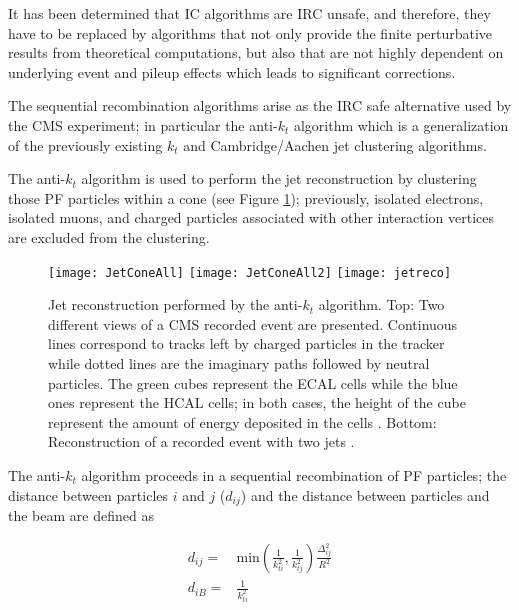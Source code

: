 It has been determined that IC algorithms are IRC unsafe, and therefore, they have to be replaced by algorithms that not only provide the finite perturbative results from theoretical computations, but also that are not highly dependent on underlying event and pileup effects which leads to significant corrections\cite{coco}.

The sequential recombination algorithms arise as the IRC safe alternative used by the CMS experiment; in particular the anti-$k_t$ algorithm\cite{antikt} which is a generalization of the previously existing $k_t$ \cite{kt} and Cambridge/Aachen \cite{ac} jet clustering algorithms.

The anti-$k_t$ algorithm is used to perform the jet reconstruction by clustering those PF particles within a cone (see Figure \ref{fig:jetcone}); previously, isolated electrons, isolated muons, and charged particles associated with other interaction vertices are excluded from the clustering.  

\begin{figure}[!h]
  \centering
  \texttt{[image: JetConeAll]}
  \texttt{[image: JetConeAll2]}
    \texttt{[image: jetreco]}
  \caption[Jet reconstruction.]{Jet reconstruction performed by the anti-$k_t$ algorithm. Top: Two different views of a CMS recorded event are presented. Continuous lines correspond to tracks left by charged particles in the tracker while dotted lines are the imaginary paths followed by neutral particles. The green cubes represent the ECAL cells while the blue ones represent the HCAL cells; in both cases, the height of the cube represent the amount of energy deposited in the cells \cite{jetconeview}. Bottom: Reconstruction of a recorded event with two jets \cite{jetreco}.}\label{fig:jetcone}
\end{figure}

The anti-$k_t$ algorithm proceeds in a sequential recombination of PF particles; the distance between particles $i$ and $j$ ($d_{ij}$)  and the distance between particles and the beam are defined as

\begin{align}\label{cov_der}
  d_{ij} = & \textrm{min}\left(\frac{1}{k_{ti}^2},\frac{1}{k_{tj}^2}\right)\frac{\Delta_{ij}^2}{R^2} \nonumber\\
  d_{iB} = & \frac{1}{k_{ti}^2}
\end{align}

